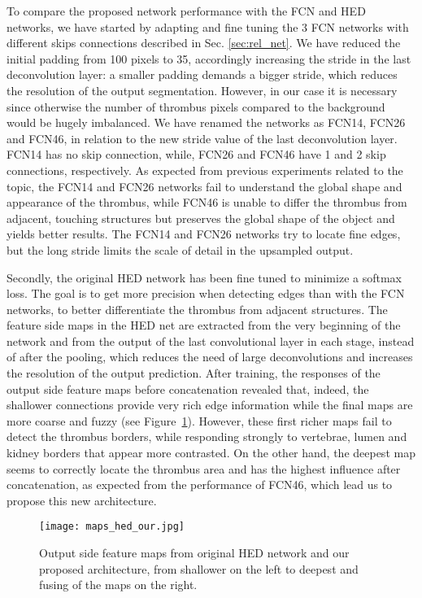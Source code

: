 \documentclass[preprint,authoryear,12pt]{elsarticle}
\begin{document}
To compare the proposed network performance with the FCN and HED networks, we have started by adapting and fine tuning the 3 FCN networks with different skips connections described in Sec. \ref{sec:rel_net}. We have reduced the initial padding from 100 pixels to 35, accordingly increasing the stride in the last deconvolution layer: a smaller padding demands a bigger stride, which reduces the resolution of the output segmentation. However, in our case it is necessary since otherwise the number of thrombus pixels compared to the background would be hugely imbalanced. We have renamed the networks as FCN14, FCN26 and FCN46, in relation to the new stride value of the last deconvolution layer. FCN14 has no skip connection, while, FCN26 and FCN46 have 1 and 2 skip connections, respectively.
As expected from previous experiments related to the topic, the FCN14 and FCN26 networks fail to understand the global shape and appearance of the thrombus, while FCN46 is unable to differ the thrombus from adjacent, touching structures but preserves the global shape of the object and yields better results. The FCN14 and FCN26 networks try to locate fine edges, but the long stride limits the scale of detail in the upsampled output. 

Secondly, the original HED network has been fine tuned to minimize a softmax loss. The goal is to get more precision when detecting edges than with the FCN networks, to better differentiate the thrombus from adjacent structures. The feature side maps in the HED net are extracted from the very beginning of the network and from the output of the last convolutional layer in each stage, instead of after the pooling, which reduces the need of large deconvolutions and increases the resolution of the output prediction. After training, the responses of the output side feature maps before concatenation revealed that, indeed, the shallower connections provide very rich edge information while the final maps are more coarse and fuzzy (see Figure~\ref{fig:hed_maps}). However, these first richer maps fail to detect the thrombus borders, while responding strongly to vertebrae, lumen and kidney borders that appear more contrasted. On the other hand, the deepest map seems to correctly locate the thrombus area and has the highest influence after concatenation, as expected from the performance of FCN46, which lead us to propose this new architecture. \par

\begin{figure}[htb]
\centering
\texttt{[image: maps\_hed\_our.jpg]}
\caption{\label{fig:hed_maps}Output side feature maps from original HED network and our proposed architecture, from shallower on the left to deepest and fusing of the maps on the right.}
\end{figure}
\end{document}
